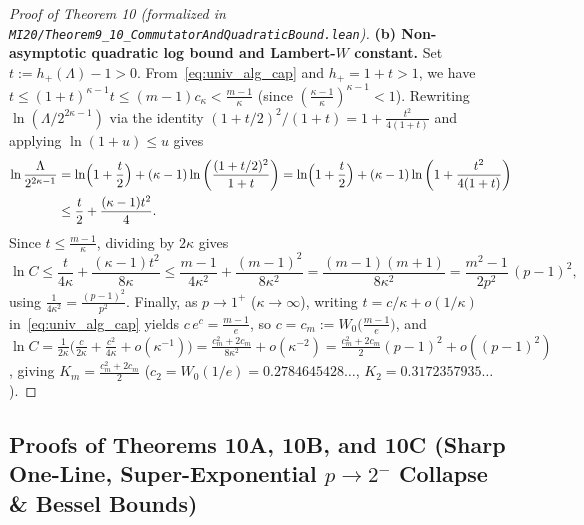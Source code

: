 \documentclass[10pt,letterpaper]{article}
\begin{document}
\begin{proof}[Proof of Theorem 10 (formalized in \texttt{MI20/Theorem9\_10\_\allowbreak CommutatorAndQuadraticBound.lean})]
\textbf{(b) Non-asymptotic quadratic log bound and Lambert-$W$ constant.} Set $t := h_+(\Lambda) - 1 > 0$. From~\eqref{eq:univ_alg_cap} and $h_+ = 1 + t > 1$, we have $t \le (1+t)^{\kappa-1} t \le (m-1)c_\kappa < \frac{m-1}{\kappa}$ (since $(\frac{\kappa-1}{\kappa})^{\kappa-1} < 1$). Rewriting $\ln(\Lambda / 2^{2\kappa-1})$ via the identity $(1 + t/2)^2 / (1 + t) = 1 + \frac{t^2}{4(1+t)}$ and applying $\ln(1 + u) \le u$ gives
\begin{align*}
  \ln\frac{\Lambda}{2^{2\kappa-1}}
  &= \ln\Bigl(1 + \frac{t}{2}\Bigr) + (\kappa - 1)\ln\left(\frac{(1 + t/2)^2}{1 + t}\right)
   = \ln\Bigl(1 + \frac{t}{2}\Bigr) + (\kappa - 1)\ln\left(1 + \frac{t^2}{4(1+t)}\right) \\
  &\le \frac{t}{2} + \frac{(\kappa - 1) t^2}{4}.
\end{align*}
Since $t \le \frac{m-1}{\kappa}$, dividing by $2\kappa$ gives
\[
  \ln C \le \frac{t}{4\kappa} + \frac{(\kappa - 1)t^2}{8\kappa}
  \le \frac{m - 1}{4\kappa^2} + \frac{(m - 1)^2}{8\kappa^2}
  = \frac{(m - 1)(m + 1)}{8\kappa^2}
  = \frac{m^2 - 1}{2p^2}\,(p - 1)^2,
\]
using $\frac{1}{4\kappa^2} = \frac{(p-1)^2}{p^2}$. Finally, as $p \to 1^+$ ($\kappa \to \infty$), writing $t = c/\kappa + o(1/\kappa)$ in~\eqref{eq:univ_alg_cap} yields $c\, e^c = \frac{m-1}{e}$, so $c = c_m := W_0\bigl(\frac{m-1}{e}\bigr)$, and $\ln C = \frac{1}{2\kappa}\bigl(\frac{c}{2\kappa} + \frac{c^2}{4\kappa} + o(\kappa^{-1})\bigr) = \frac{c_m^2 + 2c_m}{8\kappa^2} + o(\kappa^{-2}) = \frac{c_m^2 + 2c_m}{2}(p - 1)^2 + o((p-1)^2)$, giving $K_m = \frac{c_m^2 + 2c_m}{2}$ ($c_2 = W_0(1/e) = 0.2784645428\dots$, $K_2 = 0.3172357935\dots$).
\end{proof}

\subsection{Proofs of Theorems 10A, 10B, and 10C (Sharp One-Line, Super-Exponential $p \to 2^-$ Collapse \& Bessel Bounds)}
\end{document}
